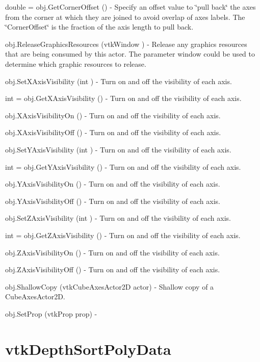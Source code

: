 \begin{DoxyItemize}
\item {\ttfamily double = obj.\-Get\-Corner\-Offset ()} -\/ Specify an offset value to \char`\"{}pull back\char`\"{} the axes from the corner at which they are joined to avoid overlap of axes labels. The \char`\"{}\-Corner\-Offset\char`\"{} is the fraction of the axis length to pull back.  
\item {\ttfamily obj.\-Release\-Graphics\-Resources (vtk\-Window )} -\/ Release any graphics resources that are being consumed by this actor. The parameter window could be used to determine which graphic resources to release.  
\item {\ttfamily obj.\-Set\-X\-Axis\-Visibility (int )} -\/ Turn on and off the visibility of each axis.  
\item {\ttfamily int = obj.\-Get\-X\-Axis\-Visibility ()} -\/ Turn on and off the visibility of each axis.  
\item {\ttfamily obj.\-X\-Axis\-Visibility\-On ()} -\/ Turn on and off the visibility of each axis.  
\item {\ttfamily obj.\-X\-Axis\-Visibility\-Off ()} -\/ Turn on and off the visibility of each axis.  
\item {\ttfamily obj.\-Set\-Y\-Axis\-Visibility (int )} -\/ Turn on and off the visibility of each axis.  
\item {\ttfamily int = obj.\-Get\-Y\-Axis\-Visibility ()} -\/ Turn on and off the visibility of each axis.  
\item {\ttfamily obj.\-Y\-Axis\-Visibility\-On ()} -\/ Turn on and off the visibility of each axis.  
\item {\ttfamily obj.\-Y\-Axis\-Visibility\-Off ()} -\/ Turn on and off the visibility of each axis.  
\item {\ttfamily obj.\-Set\-Z\-Axis\-Visibility (int )} -\/ Turn on and off the visibility of each axis.  
\item {\ttfamily int = obj.\-Get\-Z\-Axis\-Visibility ()} -\/ Turn on and off the visibility of each axis.  
\item {\ttfamily obj.\-Z\-Axis\-Visibility\-On ()} -\/ Turn on and off the visibility of each axis.  
\item {\ttfamily obj.\-Z\-Axis\-Visibility\-Off ()} -\/ Turn on and off the visibility of each axis.  
\item {\ttfamily obj.\-Shallow\-Copy (vtk\-Cube\-Axes\-Actor2\-D actor)} -\/ Shallow copy of a Cube\-Axes\-Actor2\-D.  
\item {\ttfamily obj.\-Set\-Prop (vtk\-Prop prop)} -\/  
\end{DoxyItemize}\hypertarget{vtkhybrid_vtkdepthsortpolydata}{}\section{vtk\-Depth\-Sort\-Poly\-Data}\label{vtkhybrid_vtkdepthsortpolydata}
